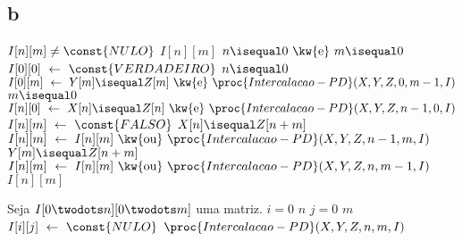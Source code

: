 \subsection{b}

\def\And{\mbox{ \kw{e} }}
\def\Or{\mbox{ \kw{ou} }}

\begin{codebox}
    \li {} $I[n][m] \ne \const{NULO}$
        \Then
    \li     {} $I[n][m]$
        \End
    \li
    \li {} $n \isequal 0 \And m \isequal 0$
        \Then
    \li     $I[0][0] \gets \const{VERDADEIRO}$
        \End
    \li {} $n \isequal 0$
        \Then
    \li     $I[0][m] \gets Y[m] \isequal Z[m] \And \proc{Intercalacao-PD}(X, Y, Z, 0, m-1, I)$
        \End
    \li {} $m \isequal 0$
        \Then
    \li     $I[n][0] \gets X[n] \isequal Z[n] \And \proc{Intercalacao-PD}(X, Y, Z, n-1, 0, I)$
        \End
    \li {}
        \Then
    \li     $I[n][m] \gets \const{FALSO}$
    \li     {} $X[n] \isequal Z[n + m]$
            \Then
    \li         $I[n][m] \gets I[n][m] \Or \proc{Intercalacao-PD}(X, Y, Z, n - 1, m, I)$
            \End
    \li     {} $Y[m] \isequal Z[n + m]$
            \Then
    \li         $I[n][m] \gets I[n][m] \Or \proc{Intercalacao-PD}(X, Y, Z, n, m - 1, I)$
            \End
        \End
    \li
    \li {} $I[n][m]$
\end{codebox}

\begin{codebox}
    \li Seja $I[0 \twodots n][0 \twodots m]$ uma matriz.
    \li
    \li {} $i = 0$  $n$
        \Do
    \li     {} $j = 0$  $m$
            \Do
    \li         $I[i][j] \gets \const{NULO}$
            \End
        \End
    \li
    \li {} $\proc{Intercalacao-PD}(X, Y, Z, n, m, I)$
\end{codebox}
